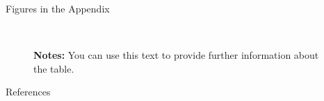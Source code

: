 \documentclass[11pt, aspectratio=169, t]{beamer}
\begin{document}
\begin{frame}{Figures in the Appendix}
\begin{figure}
{\begin{figure}[H]
\begin{minipage}{0.35\linewidth}
\end{minipage}%
%
\begin{minipage}{0.05\linewidth}
~\end{minipage}%

\end{figure}%

\vspace{-5pt}
\begin{minipage}{0.9\textwidth}
\scriptsize
\singlespacing
\textbf{Notes:} You can use this text to provide further information about the table. \lipsum[66]
\end{minipage}
\vspace{15pt}

}

\end{figure}%
\end{frame}
\begin{frame}[allowframebreaks]{References}
\small
\printbibliography[heading=none]
\end{frame}
\end{document}
